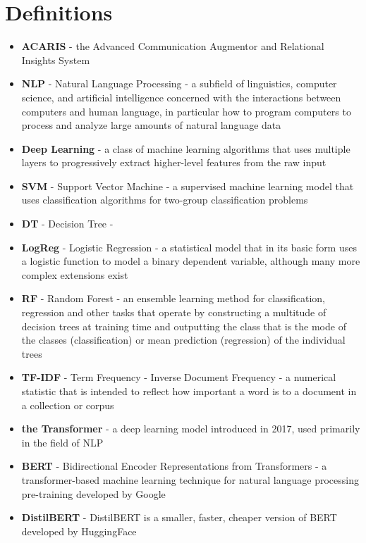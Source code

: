 \documentclass{article}
\begin{document}
\section{Definitions}
\begin{itemize}
	\item \textbf{ACARIS} - the Advanced Communication Augmentor and Relational Insights System
	\item \textbf{NLP} - Natural Language Processing - a subfield of linguistics, computer science, and artificial intelligence concerned with the interactions between computers and human language, in particular how to program computers to process and analyze large amounts of natural language data
	\item \textbf{Deep Learning} - a class of machine learning algorithms that uses multiple layers to progressively extract higher-level features from the raw input
	\item \textbf{SVM} - Support Vector Machine - a supervised machine learning model that uses classification algorithms for two-group classification problems
	\item \textbf{DT} - Decision Tree - 
	\item \textbf{LogReg} - Logistic Regression - a statistical model that in its basic form uses a logistic function to model a binary dependent variable, although many more complex extensions exist
	\item \textbf{RF} - Random Forest - an ensemble learning method for classification, regression and other tasks that operate by constructing a multitude of decision trees at training time and outputting the class that is the mode of the classes (classification) or mean prediction (regression) of the individual trees
	\item \textbf{TF-IDF} - Term Frequency - Inverse Document Frequency - a numerical statistic that is intended to reflect how important a word is to a document in a collection or corpus
	\item \textbf{the Transformer} - a deep learning model introduced in 2017, used primarily in the field of NLP\cite{vaswani2017attention}
	\item \textbf{BERT} - Bidirectional Encoder Representations from Transformers - a transformer-based machine learning technique for natural language processing pre-training developed by Google\cite{devlin2019bert}
	\item \textbf{DistilBERT} - DistilBERT is a smaller, faster, cheaper version of BERT developed by HuggingFace\cite{sanh2020distilbert}

\end{itemize}
\end{document}
